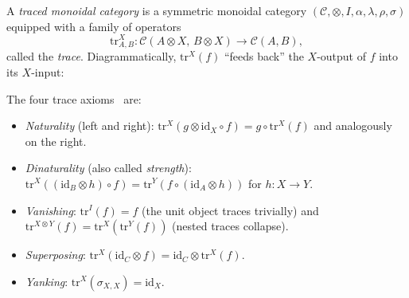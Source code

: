 \documentclass[11pt]{article}
\newcommand{\id}{\mathrm{id}}
\begin{document}
A \emph{traced monoidal category} is a symmetric monoidal category
$(\mathcal{C}, \otimes, I, \alpha, \lambda, \rho, \sigma)$ equipped
with a family of operators
\[
  \mathrm{tr}^X_{A, B} : \mathcal{C}(A \otimes X,\, B \otimes X)
                       \to \mathcal{C}(A, B),
\]
called the \emph{trace}.  Diagrammatically, $\mathrm{tr}^X(f)$
``feeds back'' the $X$-output of $f$ into its $X$-input:
\begin{center}
\end{center}
The four trace axioms~\cite{JSV} are:
\begin{itemize}
  \item \emph{Naturality} (left and right):
        $\mathrm{tr}^X(g \otimes \id_X \circ f) = g \circ \mathrm{tr}^X(f)$
        and analogously on the right.
  \item \emph{Dinaturality} (also called \emph{strength}):
        $\mathrm{tr}^X((\id_B \otimes h) \circ f) =
         \mathrm{tr}^Y(f \circ (\id_A \otimes h))$
        for $h : X \to Y$.
  \item \emph{Vanishing}:
        $\mathrm{tr}^I(f) = f$ (the unit object traces trivially) and
        $\mathrm{tr}^{X \otimes Y}(f) = \mathrm{tr}^X(\mathrm{tr}^Y(f))$
        (nested traces collapse).
  \item \emph{Superposing}:
        $\mathrm{tr}^X(\id_C \otimes f) = \id_C \otimes \mathrm{tr}^X(f)$.
  \item \emph{Yanking}: $\mathrm{tr}^X(\sigma_{X,X}) = \id_X$.
\end{itemize}
\end{document}
